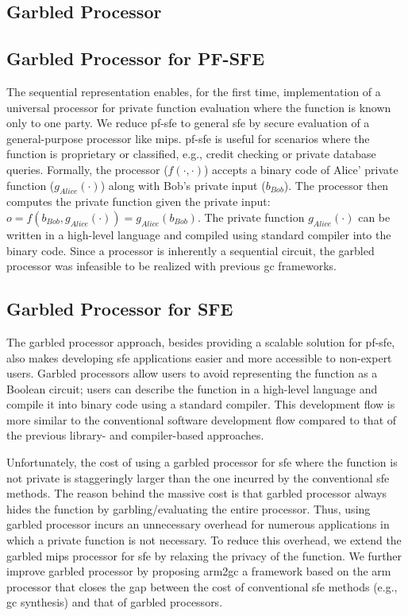 \subsection{Garbled Processor}
\subsection{Garbled Processor for PF-SFE}
The sequential representation enables, for the first time, implementation of a universal processor for private function evaluation where the function is known only to one party.
We reduce \acrfull{pf-sfe} to general \acrshort{sfe} by secure evaluation of a general-purpose processor like \gls{mips}.
\acrshort{pf-sfe} is useful for scenarios where the function is proprietary or classified, e.g., credit checking or private database queries.
Formally, the processor ($f(\cdot,\cdot)$) accepts a binary code of Alice' private function ($g_{Alice}(\cdot)$) along with Bob's private input ($b_{Bob}$).
The processor then computes the private function given the private input: $o = f(b_{Bob}, g_{Alice}(\cdot)) = g_{Alice}(b_{Bob})$.
The private function $g_{Alice}(\cdot)$ can be written in a high-level language and compiled using standard compiler into the binary code.
Since a processor is inherently a sequential circuit, the garbled processor was infeasible to be realized with previous \acrshort{gc} frameworks.

\subsection{Garbled Processor for SFE}
The garbled processor approach, besides providing a scalable solution for \acrshort{pf-sfe}, also makes developing \acrshort{sfe} applications easier and more accessible to non-expert users.
Garbled processors allow users to avoid representing the function as a Boolean circuit; users can describe the function in a high-level language and compile it into binary code using a standard compiler.
This development flow is more similar to the conventional software development flow compared to that of the previous library- and compiler-based approaches.

Unfortunately, the cost of using a garbled processor for \acrshort{sfe} where the function is not private is staggeringly larger than the one incurred by the conventional \acrshort{sfe} methods. The reason behind the massive cost is that garbled processor always hides the function by garbling/evaluating the entire processor. Thus, using garbled processor incurs an unnecessary overhead for numerous applications in which a private function is not necessary.
To reduce this overhead, we extend the garbled \gls{mips} processor for \acrshort{sfe} by relaxing the privacy of the function.
We further improve garbled processor by proposing \gls{arm2gc} a framework based on the \gls{arm} processor that closes the gap between the cost of conventional \acrshort{sfe} methods (e.g., \acrshort{gc} synthesis) and that of garbled processors.

